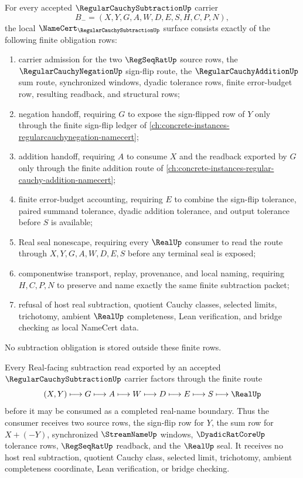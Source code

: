 \begin{theorem}
\label{thm:regular-cauchy-subtraction-namecert-obligations}
For every accepted $\RegularCauchySubtractionUp$ carrier
$$
B_-=(X,Y,G,A,W,D,E,S,H,C,P,N),
$$
the local $\NameCert_{\RegularCauchySubtractionUp}$ surface consists exactly of the following finite obligation rows:
\begin{enumerate}
\item carrier admission for the two $\RegSeqRatUp$ source rows, the $\RegularCauchyNegationUp$ sign-flip route, the $\RegularCauchyAdditionUp$ sum route, synchronized windows, dyadic tolerance rows, finite error-budget row, resulting readback, and structural rows;
\item negation handoff, requiring $G$ to expose the sign-flipped row of $Y$ only through the finite sign-flip ledger of \autoref{ch:concrete-instances-regularcauchynegation-namecert};
\item addition handoff, requiring $A$ to consume $X$ and the readback exported by $G$ only through the finite addition route of \autoref{ch:concrete-instances-regular-cauchy-addition-namecert};
\item finite error-budget accounting, requiring $E$ to combine the sign-flip tolerance, paired summand tolerance, dyadic addition tolerance, and output tolerance before $S$ is available;
\item Real seal nonescape, requiring every $\RealUp$ consumer to read the route through $X,Y,G,A,W,D,E,S$ before any terminal seal is exposed;
\item componentwise transport, replay, provenance, and local naming, requiring $H,C,P,N$ to preserve and name exactly the same finite subtraction packet;
\item refusal of host real subtraction, quotient Cauchy classes, selected limits, trichotomy, ambient $\RealUp$ completeness, Lean verification, and bridge checking as local NameCert data.
\end{enumerate}
No subtraction obligation is stored outside these finite rows.
\end{theorem}

\begin{theorem}
\label{thm:regular-cauchy-subtraction-real-seal-handoff}
Every Real-facing subtraction read exported by an accepted $\RegularCauchySubtractionUp$ carrier factors through the finite route
$$
(X,Y)\longmapsto G\longmapsto A\longmapsto W\longmapsto D\longmapsto E\longmapsto S\longmapsto \RealUp
$$
before it may be consumed as a completed real-name boundary. Thus the consumer receives two source rows, the sign-flip row for $Y$, the sum row for $X+(-Y)$, synchronized $\StreamNameUp$ windows, $\DyadicRatCoreUp$ tolerance rows, $\RegSeqRatUp$ readback, and the $\RealUp$ seal. It receives no host real subtraction, quotient Cauchy class, selected limit, trichotomy, ambient completeness coordinate, Lean verification, or bridge checking.
\end{theorem}


